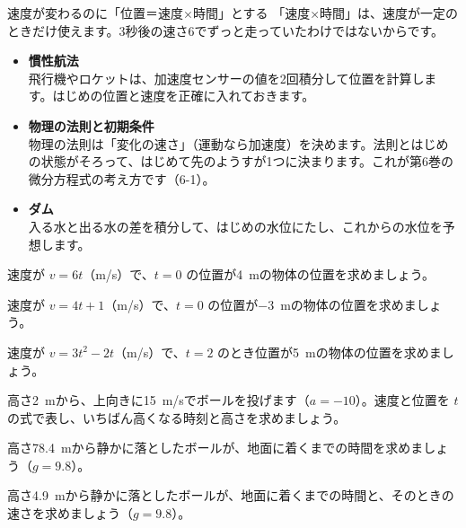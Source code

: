 \begin{tsumazuki}{速度が変わるのに「位置＝速度×時間」とする}
「速度×時間」は、速度が一定のときだけ使えます。3秒後の速さ6でずっと走っていたわけではないからです。
\end{tsumazuki}

\begin{butsuri}
\begin{itemize}[leftmargin=1.2\zw, itemsep=1pt, topsep=0pt, label={\color{bkPurple}●}]
\item \textbf{慣性航法}\\飛行機やロケットは、加速度センサーの値を2回積分して位置を計算します。はじめの位置と速度を正確に入れておきます。
\item \textbf{物理の法則と初期条件}\\物理の法則は「変化の速さ」（運動なら加速度）を決めます。法則とはじめの状態がそろって、はじめて先のようすが1つに決まります。これが第6巻の微分方程式の考え方です（6-1）。
\item \textbf{ダム}\\入る水と出る水の差を積分して、はじめの水位にたし、これからの水位を予想します。
\end{itemize}
\end{butsuri}

\bkendproblems
{}

\bkproblem 速度が $v=6t$（m/s）で、$t=0$ の位置が\qty{4}{m}の物体の位置を求めましょう。

\bkproblem 速度が $v=4t+1$（m/s）で、$t=0$ の位置が\qty{-3}{m}の物体の位置を求めましょう。

\bkproblem 速度が $v=3t^2-2t$（m/s）で、$t=2$ のとき位置が\qty{5}{m}の物体の位置を求めましょう。

\bkproblem 高さ\qty{2}{m}から、上向きに\qty{15}{m/s}でボールを投げます（$a=-10$）。速度と位置を $t$ の式で表し、いちばん高くなる時刻と高さを求めましょう。

\bkproblem 高さ\qty{78.4}{m}から静かに落としたボールが、地面に着くまでの時間を求めましょう（$g=9.8$）。

\bkproblem 高さ\qty{4.9}{m}から静かに落としたボールが、地面に着くまでの時間と、そのときの速さを求めましょう（$g=9.8$）。

